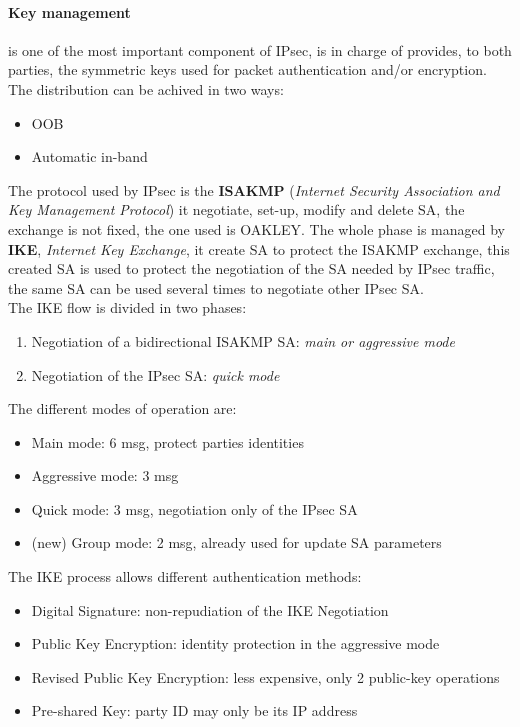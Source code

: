 \documentclass[12pt]{article}
\begin{document}
\paragraph{Key management} is one of the most important component of IPsec, is in charge of provides, to both parties, the symmetric keys used for packet authentication and/or encryption. The distribution can be achived in two ways:
\begin{itemize}
  \item OOB
  \item Automatic in-band
\end{itemize}
The protocol used by IPsec is the \textbf{ISAKMP} (\textit{Internet Security Association and Key Management Protocol}) it negotiate, set-up, modify and delete SA, the exchange is not fixed, the one used is OAKLEY.
The whole phase is managed by \textbf{IKE}, \textit{Internet Key Exchange}, it create SA to protect the ISAKMP exchange, this created SA is used to protect the negotiation of the SA needed by IPsec traffic, the same SA can be used several times to negotiate other IPsec SA.\\
The IKE flow is divided in two phases:
\begin{enumerate}
  \item Negotiation of a bidirectional ISAKMP SA: \textit{main or aggressive mode}
  \item Negotiation of the IPsec SA: \textit{quick mode}
\end{enumerate}
The different modes of operation are:
\begin{itemize}
  \item Main mode: 6 msg, protect parties identities
  \item Aggressive mode: 3 msg
  \item Quick mode: 3 msg, negotiation only of the IPsec SA
  \item (new) Group mode: 2 msg, already used for update SA parameters
\end{itemize}
The IKE process allows different authentication methods:
\begin{itemize}
  \item Digital Signature: non-repudiation of the IKE Negotiation
  \item Public Key Encryption: identity protection in the aggressive mode
  \item Revised Public Key Encryption: less expensive, only 2 public-key operations
  \item Pre-shared Key: party ID may only be its IP address
\end{itemize}
\end{document}
